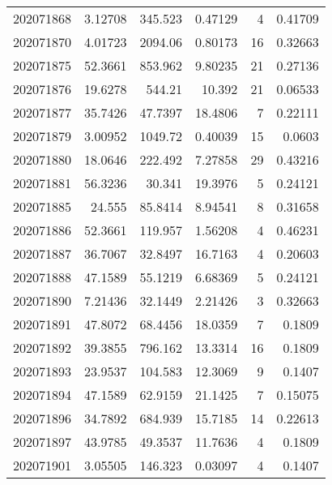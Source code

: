 \begin{tabular}{rrrrrr}
 202071868 &          3.12708 &      345.523  &            0.47129 &           4 & 0.41709 \\
 202071870 &          4.01723 &     2094.06   &            0.80173 &          16 & 0.32663 \\
 202071875 &         52.3661  &      853.962  &            9.80235 &          21 & 0.27136 \\
 202071876 &         19.6278  &      544.21   &           10.392   &          21 & 0.06533 \\
 202071877 &         35.7426  &       47.7397 &           18.4806  &           7 & 0.22111 \\
 202071879 &          3.00952 &     1049.72   &            0.40039 &          15 & 0.0603  \\
 202071880 &         18.0646  &      222.492  &            7.27858 &          29 & 0.43216 \\
 202071881 &         56.3236  &       30.341  &           19.3976  &           5 & 0.24121 \\
 202071885 &         24.555   &       85.8414 &            8.94541 &           8 & 0.31658 \\
 202071886 &         52.3661  &      119.957  &            1.56208 &           4 & 0.46231 \\
 202071887 &         36.7067  &       32.8497 &           16.7163  &           4 & 0.20603 \\
 202071888 &         47.1589  &       55.1219 &            6.68369 &           5 & 0.24121 \\
 202071890 &          7.21436 &       32.1449 &            2.21426 &           3 & 0.32663 \\
 202071891 &         47.8072  &       68.4456 &           18.0359  &           7 & 0.1809  \\
 202071892 &         39.3855  &      796.162  &           13.3314  &          16 & 0.1809  \\
 202071893 &         23.9537  &      104.583  &           12.3069  &           9 & 0.1407  \\
 202071894 &         47.1589  &       62.9159 &           21.1425  &           7 & 0.15075 \\
 202071896 &         34.7892  &      684.939  &           15.7185  &          14 & 0.22613 \\
 202071897 &         43.9785  &       49.3537 &           11.7636  &           4 & 0.1809  \\
 202071901 &          3.05505 &      146.323  &            0.03097 &           4 & 0.1407  \\

\end{tabular}
